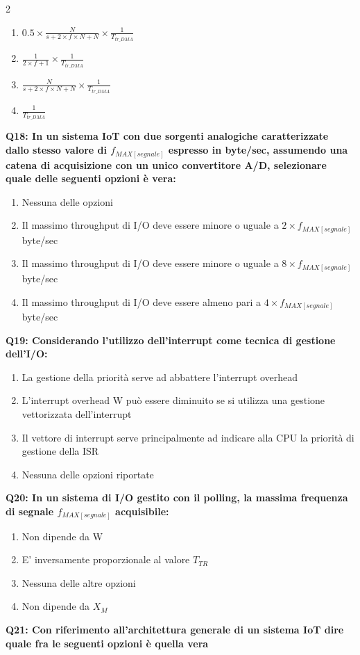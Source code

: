 \documentclass[10pt]{article}
\begin{document}
\begin{multicols}{2}
\begin{enumerate}[label=\arabic*.]
\item $0.5 \times \frac{N}{s+ 2 \times f \times N + N} \times \frac{1}{T_{tr\_DMA}} $
\item $\frac{1}{ 2 \times f + 1} \times \frac{1}{T_{tr\_DMA}} $
\item $\frac{N}{s+ 2 \times f \times N + N} \times \frac{1}{T_{tr\_DMA}} $
\item $\frac{1}{T_{tr\_DMA}}$
\end{enumerate}
\textbf{Q18: In un sistema IoT con due sorgenti analogiche caratterizzate dallo stesso valore di $f_{MAX[segnale]}$ espresso in byte/sec, assumendo una catena di acquisizione con un unico convertitore A/D, selezionare quale delle seguenti opzioni è vera:}

\begin{enumerate}[label=\arabic*.]
\item Nessuna delle opzioni
\item Il massimo throughput di I/O deve essere minore o uguale a $2 \times f_{MAX[segnale]}$ byte/sec
\item Il massimo throughput di I/O deve essere minore o uguale a $8 \times f_{MAX[segnale]}$ byte/sec
\item Il massimo throughput di I/O deve essere almeno pari a $4 \times f_{MAX[segnale]}$ byte/sec
\end{enumerate}
\textbf{Q19: Considerando l’utilizzo dell’interrupt come tecnica di gestione dell’I/O:}

\begin{enumerate}[label=\arabic*.]
\item La gestione della priorità serve ad abbattere l’interrupt overhead
\item L’interrupt overhead W può essere diminuito se si utilizza una gestione vettorizzata dell’interrupt
\item Il vettore di interrupt serve principalmente ad indicare alla CPU la priorità di gestione della ISR
\item Nessuna delle opzioni riportate
\end{enumerate}
\textbf{Q20: In un sistema di I/O gestito con il polling, la massima frequenza di segnale $f_{MAX[segnale]}$ acquisibile:}

\begin{enumerate}[label=\arabic*.]
\item Non dipende da W
\item E' inversamente proporzionale al valore $T_{TR}$
\item Nessuna delle altre opzioni
\item Non dipende da $X_M$
\end{enumerate}
\textbf{Q21: Con riferimento all’architettura generale di un sistema IoT dire quale fra le seguenti opzioni è quella vera}


\end{multicols}
\end{document}
